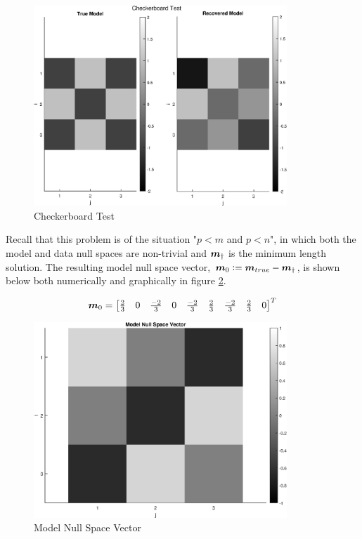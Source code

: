 \begin{figure}[h] 
	\centering
	\includegraphics[width=0.85\textwidth]{./images/prob1_checkerboard_test.eps}
	\caption{Checkerboard Test}
	\label{fig: prob1 checkerboard test}
\end{figure}
\FloatBarrier

Recall that this problem is of the situation "$p < m$ and $p < n$", in which both the model and data null spaces are non-trivial and $\boldsymbol{m}_\dagger$ is the minimum length solution. The resulting model null space vector, $\boldsymbol{m}_0 \vcentcolon= \boldsymbol{m}_{true} - \boldsymbol{m}_{\dagger}$, is shown below both numerically and graphically in figure \ref{fig: prob1 model null space vector}.

\begin{align*}
	\boldsymbol{m}_0 = \begin{bmatrix}
		\frac{2}{3} & 0 & \frac{-2}{3} & 0 & \frac{-2}{3} & \frac{2}{3} & \frac{-2}{3} & \frac{2}{3} & 0
	\end{bmatrix}^T
\end{align*}

\begin{figure}[h] 
	\centering
	\includegraphics[width=0.85\textwidth]{./images/prob1_model_null_space_vector.eps}
	\caption{Model Null Space Vector}
	\label{fig: prob1 model null space vector}
\end{figure}
\FloatBarrier

